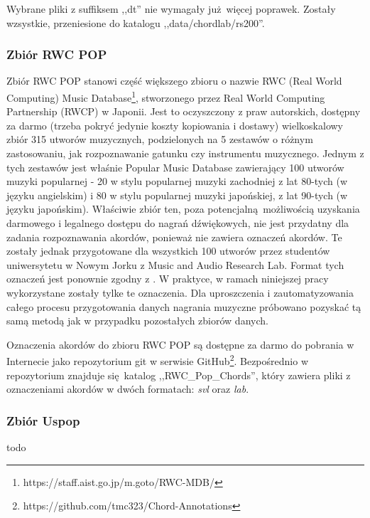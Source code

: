 Wybrane pliki z suffiksem ,,dt'' nie wymagały już więcej poprawek. Zostały wzsystkie, przeniesione
do katalogu ,,data/chordlab/rs200''.

\subsubsection{Zbiór RWC POP}

Zbiór RWC POP \cite{goto_rwc_nodate} stanowi część większego zbioru o nazwie RWC (Real World
Computing) Music Database\footnote{https://staff.aist.go.jp/m.goto/RWC-MDB/}, stworzonego przez Real
World Computing Partnership (RWCP) w Japonii. Jest to oczyszczony z praw autorskich, dostępny za
darmo (trzeba pokryć jedynie koszty kopiowania i dostawy) wielkoskalowy zbiór 315 utworów
muzycznych, podzielonych na 5 zestawów o różnym zastosowaniu, jak rozpoznawanie gatunku czy
instrumentu muzycznego. Jednym z tych zestawów jest właśnie Popular Music Database zawierający 100
utworów muzyki popularnej - 20 w stylu popularnej muzyki zachodniej z lat 80-tych (w języku
angielskim) i 80 w stylu popularnej muzyki japońskiej, z lat 90-tych (w języku japońskim). Właściwie
zbiór ten, poza potencjalną możliwością uzyskania darmowego i legalnego dostępu do nagrań
dźwiękowych, nie jest przydatny dla zadania rozpoznawania akordów, ponieważ nie zawiera oznaczeń
akordów. Te zostały jednak przygotowane dla wszystkich 100 utworów przez studentów uniwersytetu w
Nowym Jorku z Music and Audio Research Lab. Format tych oznaczeń jest ponownie zgodny z
\cite{harte_towards_nodate}. W praktyce, w ramach niniejszej pracy wykorzystane zostały tylke te
oznaczenia. Dla uproszczenia i zautomatyzowania całego procesu przygotowania danych nagrania
muzyczne próbowano pozyskać tą samą metodą jak w przypadku pozostałych zbiorów danych.

Oznaczenia akordów do zbioru RWC POP są dostępne za darmo do pobrania w Internecie jako repozytorium
git w serwisie GitHub\footnote{https://github.com/tmc323/Chord-Annotations}. Bezpośrednio w
repozytorium znajduje się katalog ,,RWC_Pop_Chords'', który zawiera pliki z oznaczeniami
akordów w dwóch formatach: \emph{svl} oraz \emph{lab}.

\subsubsection{Zbiór Uspop}
todo





